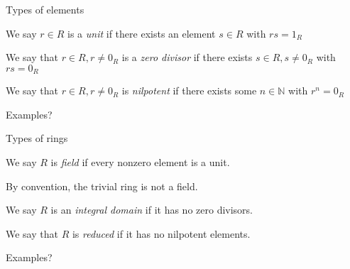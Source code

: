 \documentclass{beamer}
\begin{document}
\begin{frame}{Types of elements}


\begin{definition}
We say $r\in R$ is a \emph{unit} if there exists an element $s\in R$ with $rs=1_R$
\end{definition}

\begin{definition}
We say that $r\in R, r\neq 0_R$ is a \emph{zero divisor}
if there exists $s\in R, s\neq 0_R$ with $rs=0_R$
\end{definition}

\begin{definition}
We say that $r\in R, r\neq 0_R$ is \emph{nilpotent}
if there exists some $n\in\mathbb{N}$ with $r^n=0_R$
\end{definition}

\begin{block}{Examples?}
 \end{block}

\end{frame}


\begin{frame}{Types of rings}

\begin{definition}
We say $R$ is \emph{field} if every nonzero element is a unit.
\end{definition}
By convention, the trivial ring is not a field.
\begin{definition}
We say $R$ is an \emph{integral domain} if it has no zero divisors.
\end{definition}

\begin{definition}
We say that $R$ is \emph{reduced} if it has no nilpotent elements.
\end{definition}

\begin{block}{Examples?}
\end{block}

\end{frame}
\end{document}
